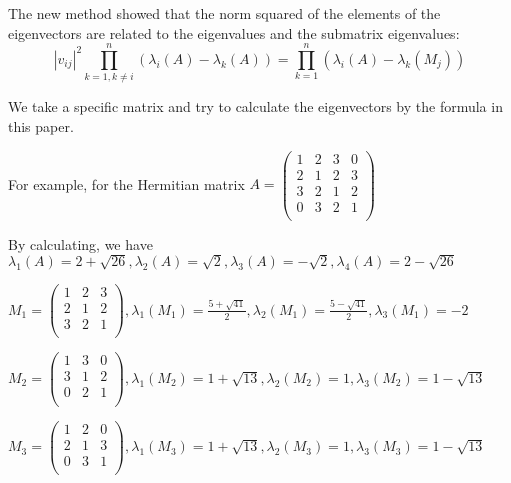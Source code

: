 \documentclass{amsart}
\theoremstyle{definition}
\theoremstyle{remark}
\numberwithin{equation}{section}
\begin{document}
The new method showed that the norm squared of the elements of the eigenvectors are related to the
eigenvalues and the submatrix eigenvalues:\\
$$
\left| v_{ij} \right|^2\prod_{k=1,k\ne i}^n{\left( \lambda _i\left( A \right) -\lambda _k\left( A \right) \right)}=\prod_{k=1}^n{\left( \lambda _i\left( A \right) -\lambda _k\left( M_{j} \right) \right)}
$$

We take a specific matrix and try to calculate the eigenvectors by the formula in this paper.

For example, for the Hermitian matrix
$
A=\left( \begin{matrix}
	1&		2&		3&		0\\
	2&		1&		2&		3\\
	3&		2&		1&		2\\
	0&		3&		2&		1\\
\end{matrix} \right) 
$

By calculating, we have
$
\lambda _1\left( A \right) =2+\sqrt{26},\lambda _2\left( A \right) =\sqrt{2},\lambda _3\left( A \right) =-\sqrt{2},\lambda _4\left( A \right) =2-\sqrt{26}
$

$
M_{1}=\left( \begin{matrix}
	1&		2&		3\\
	2&		1&		2\\
	3&		2&		1\\
\end{matrix} \right),
\lambda _1\left( M_{1} \right) =\frac{5+\sqrt{41}}{2},\lambda _2\left( M_{1} \right) =\frac{5-\sqrt{41}}{2},\lambda _3\left( M_{1} \right) =-2
$


$
M_{2}=\left( \begin{matrix}
	1&		3&		0\\
	3&		1&		2\\
	0&		2&		1\\
\end{matrix} \right) ,
\lambda _1\left( M_{2} \right) =1+\sqrt{13},\lambda _2\left( M_{2} \right) =1,\lambda _3\left( M_{2} \right) =1-\sqrt{13}
$

$
M_{3}=\left( \begin{matrix}
	1&		2&		0\\
	2&		1&		3\\
	0&		3&		1\\
\end{matrix} \right) ,
\lambda _1\left( M_{3} \right) =1+\sqrt{13},\lambda _2\left( M_{3} \right) =1,\lambda _3\left( M_{3} \right) =1-\sqrt{13}
$
\end{document}
